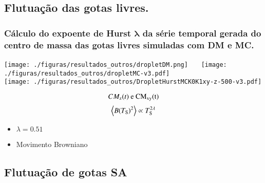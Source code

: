 \documentclass[8pt]{beamer}
\begin{document}
\subsection{Flutuação das gotas livres.}
\begin{frame}
\frametitle{\textbf{Cálculo do expoente de Hurst $\boldsymbol{\lambda}$} da série temporal gerada do centro de massa das \textbf{gotas livres} simuladas com DM e MC.}
	\pause
	\begin{minipage}{0.7\textwidth}
   	  \begin{center}
   	    \texttt{[image: ./figuras/resultados\_outros/dropletDM.png]}~~~
   	    \texttt{[image: ./figuras/resultados\_outros/dropletMC-v3.pdf]}\\
        \texttt{[image: ./figuras/resultados\_outros/DropletHurstMCK0K1xy-z-500-v3.pdf]}
   	  \end{center} 
	\end{minipage}
	\begin{minipage}{0.29\textwidth}
		$$CM_{\rm z}(t)~\rm{e}~CM_{\rm xy}(t)$$
		$$\left \langle B(T_{\rm S})^{\rm 2} \right \rangle \propto T_{\rm S}^{\rm 2 \lambda}$$				
		\begin{itemize}
			\item $\lambda=0.51$
			\item \small Movimento Browniano
		\end{itemize}
	\end{minipage}		
\end{frame}

\subsection{Flutuação de gotas SA}
\end{document}
